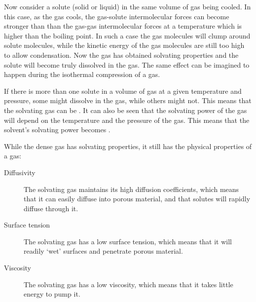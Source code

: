 Now consider a solute (solid or liquid) in the same volume of gas being cooled.
In this case, as the gas cools, the gas-solute intermolecular forces can become
stronger than than the gas-gas intermolecular forces at a temperature which is
higher than the boiling point. In such a case the gas molecules will clump
around solute molecules, while the kinetic energy of the gas molecules are still
too high to allow condensation. Now the gas has obtained solvating properties
and the solute will become truly dissolved in the gas. The same effect can be
imagined to happen during the isothermal compression of a gas.

If there is more than one solute in a volume of gas at a given temperature and
pressure, some might dissolve in the gas, while others might not. This means
that the solvating gas can be . It can also be seen that the
solvating power of the gas will depend on the temperature and the pressure of
the gas. This means that the solvent's solvating power becomes
.

While the dense gas has solvating properties, it still has the physical
properties of a gas:

\begin{description} 

\item[Diffusivity] The solvating gas maintains its high diffusion coefficients,
which means that it can easily diffuse into porous material, and that solutes
will rapidly diffuse through it.

\item[Surface tension] The solvating gas has a low surface tension, which means
that it will readily `wet' surfaces and penetrate porous material.

\item[Viscosity] The solvating gas has a low viscosity, which means that it
takes little energy to pump it.

\end{description} 

